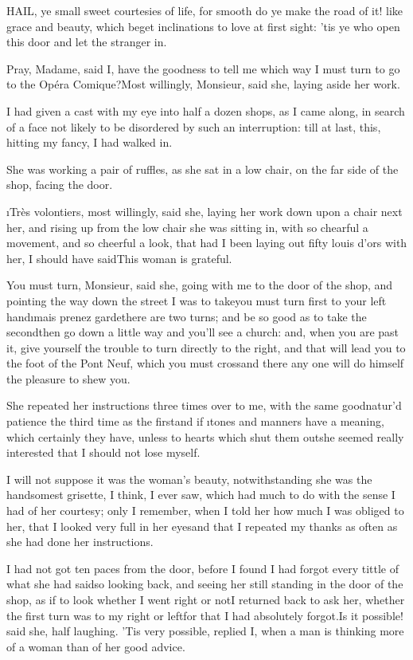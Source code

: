\documentclass[twoside]{article}
\begin{document}


HAIL, ye small sweet courtesies of life, for smooth do ye make the road
of it! like grace and beauty, which beget inclinations to love at first
sight: ’tis ye who open this door and let the stranger in.

\tsk Pray, Madame, said I, have the goodness to tell me which way I must turn
to go to the Opéra Comique?\tsk Most willingly, Monsieur, said she, laying
aside her work.\tsk 

I had given a cast with my eye into half a dozen shops, as I came along,
in search of a face not likely to be disordered by such an interruption:
till at last, this, hitting my fancy, I had walked in.

She was working a pair of ruffles, as she sat in a low chair, on the far
side of the shop, facing the door.

\tsk \i{Très volontiers}, most willingly, said she, laying her work down upon a
chair next her, and rising up from the low chair she was sitting in, with
so chearful a movement, and so cheerful a look, that had I been laying
out fifty louis d’ors with her, I should have said\tsk \lqq This woman is
grateful.\rqq

You must turn, Monsieur, said she, going with me to the door of the shop,
and pointing the way down the street I was to take\tsk you must turn first
to your left hand\tsk \i{mais prenez garde}\tsk there are two turns; and be so
good as to take the second\tsk then go down a little way and you’ll see a
church: and, when you are past it, give yourself the trouble to turn
directly to the right, and that will lead you to the foot of the Pont
Neuf, which you must cross\tsk and there any one will do himself the pleasure
to shew you.\tsk 

She repeated her instructions three times over to me, with the same
goodnatur’d patience the third time as the first\tsk and if \i{tones and
manners} have a meaning, which certainly they have, unless to hearts
which shut them out\tsk she seemed really interested that I should not lose
myself.

I will not suppose it was the woman’s beauty, notwithstanding she was the
handsomest grisette, I think, I ever saw, which had much to do with the
sense I had of her courtesy; only I remember, when I told her how much I
was obliged to her, that I looked very full in her eyes\tsk and that I
repeated my thanks as often as she had done her instructions.

I had not got ten paces from the door, before I found I had forgot every
tittle of what she had said\tsk so looking back, and seeing her still
standing in the door of the shop, as if to look whether I went right or
not\tsk I returned back to ask her, whether the first turn was to my right
or left\tsk for that I had absolutely forgot.\tsk Is it possible! said she, half
laughing.  ’Tis very possible, replied I, when a man is thinking more of
a woman than of her good advice.
\end{document}
